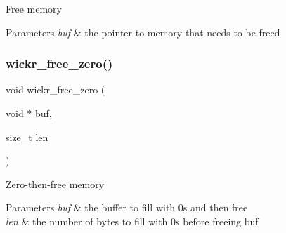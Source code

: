 Free memory


\begin{DoxyParams}{Parameters}
{\em buf} & the pointer to memory that needs to be freed \\
\hline
\end{DoxyParams}
\mbox{\label{group__memory__functions_gadad0d18d3a00f50082b6585971a62ae1}} 
\subsubsection{\texorpdfstring{wickr\_free\_zero()}{wickr\_free\_zero()}}
{\footnotesize\ttfamily void wickr\+\_\+free\+\_\+zero (\begin{DoxyParamCaption}\item[{void $\ast$}]{buf,  }\item[{size\+\_\+t}]{len }\end{DoxyParamCaption})}

Zero-\/then-\/free memory


\begin{DoxyParams}{Parameters}
{\em buf} & the buffer to fill with 0s and then free \\
\hline
{\em len} & the number of bytes to fill with 0s before freeing \textquotesingle{}buf\textquotesingle{} \\
\hline
\end{DoxyParams}
